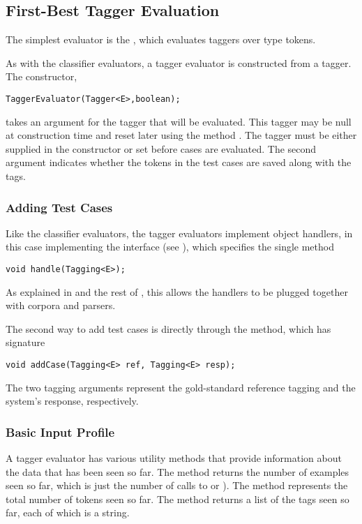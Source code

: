 \subsection{First-Best Tagger Evaluation}

The simplest evaluator is the , which evaluates
taggers over type  tokens.  

As with the classifier evaluators, a tagger evaluator is constructed
from a tagger.  The constructor,
%
\begin{verbatim}
TaggerEvaluator(Tagger<E>,boolean);
\end{verbatim}
%
takes an argument for the tagger that will be evaluated.  This tagger
may be null at construction time and reset later using the method
.  The tagger must be either supplied in the
constructor or set before cases are evaluated.  The second argument
indicates whether the tokens in the test cases are saved along with
the tags.

\subsubsection{Adding Test Cases}

Like the classifier evaluators, the tagger evaluators implement object
handlers, in this case implementing the interface
 (see ),
which specifies the single method
%
\begin{verbatim}
void handle(Tagging<E>);
\end{verbatim}
%
As explained in  and the rest of
, this allows the handlers to be plugged together with
corpora and parsers.

The second way to add test cases is directly through the 
method, which has signature
%
\begin{verbatim}
void addCase(Tagging<E> ref, Tagging<E> resp);
\end{verbatim}
%
The two tagging arguments represent the gold-standard reference
tagging and the system's response, respectively.


\subsubsection{Basic Input Profile}

A tagger evaluator has various utility methods that provide
information about the data that has been seen so far.  The method
 returns the number of examples seen so far, which is
just the number of calls to  or ).
The method  represents the total number of tokens
seen so far.  The method  returns a list of the tags
seen so far, each of which is a string.  

